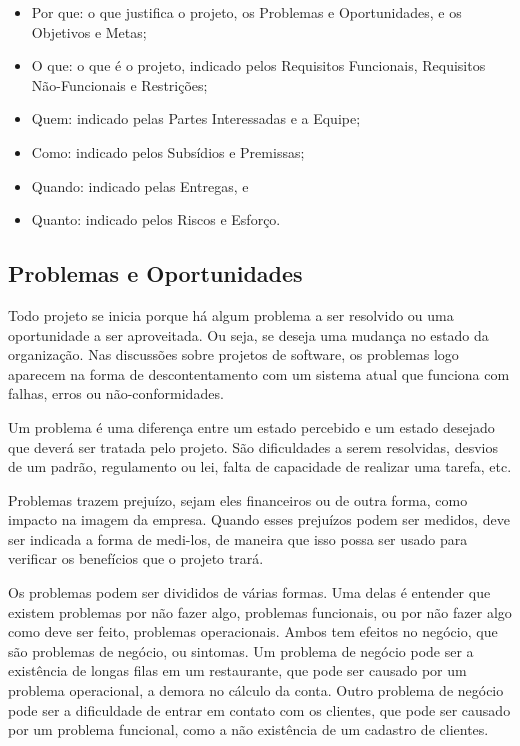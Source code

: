 \documentclass[a4]{report}
\begin{document}
\begin{itemize}
    \item Por que: o que justifica o projeto, os Problemas e Oportunidades, e os Objetivos e Metas;
    \item O que: o que é o projeto, indicado pelos Requisitos Funcionais, Requisitos Não-Funcionais e Restrições;
    \item Quem: indicado pelas Partes Interessadas e a Equipe;
    \item Como: indicado pelos Subsídios e Premissas;
    \item Quando: indicado pelas Entregas, e
    \item Quanto: indicado pelos Riscos e Esforço.
\end{itemize}

\subsection{Problemas e Oportunidades}

Todo projeto se inicia porque há algum problema a ser resolvido ou uma oportunidade a ser aproveitada. Ou seja, se deseja uma mudança no estado da organização. Nas discussões sobre projetos de software, os problemas logo aparecem na forma de descontentamento com um sistema atual que funciona com falhas, erros ou não-conformidades.

Um problema é uma diferença entre um estado percebido e um estado desejado que deverá ser tratada pelo projeto. São dificuldades a serem resolvidas, desvios de um padrão, regulamento ou lei, falta de capacidade de realizar uma tarefa, etc.

Problemas trazem prejuízo, sejam eles financeiros ou de outra forma, como impacto na imagem da empresa. Quando esses prejuízos podem ser medidos, deve ser indicada a forma de medi-los, de maneira que isso possa ser usado para verificar os benefícios que o projeto trará.

Os problemas podem ser divididos de várias formas. Uma delas é entender que existem problemas por não fazer algo, problemas funcionais, ou por não fazer algo como deve ser feito, problemas operacionais. Ambos tem efeitos no negócio, que são problemas de negócio, ou sintomas. Um problema de negócio pode ser a existência de longas filas em um restaurante, que pode ser causado por um problema operacional, a demora no cálculo da conta. Outro problema de negócio pode ser a dificuldade de entrar em contato com os clientes, que pode ser causado por um problema funcional, como a não existência de um cadastro de clientes.
\end{document}
